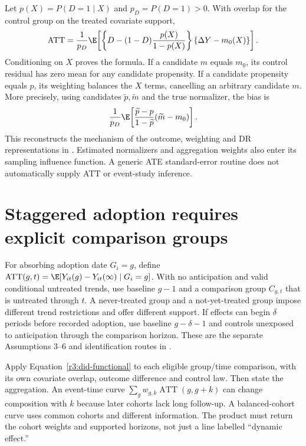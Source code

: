 Let $p(X)=P(D=1\mid X)$ and $p_D=P(D=1)>0$. With overlap for
the control group on the treated covariate support,
\begin{equation}
 \operatorname{ATT}
 =\frac1{p_D}\E\!\left[
 \left\{D-(1-D)\frac{p(X)}{1-p(X)}\right\}
                       \{\Delta Y-m_0(X)\}\right].
 \label{r3:did-dr}
\end{equation}
Conditioning on $X$ proves the formula. If a candidate $m$ equals
$m_0$, its control residual has zero mean for any candidate propensity.
If a candidate propensity equals $p$, its weighting balances the
$X$ terms, cancelling an arbitrary candidate $m$. More precisely,
using candidates $\widetilde p,\widetilde m$ and the true normalizer,
the bias is
\[
 \frac1{p_D}\E\!\left[
 \frac{\widetilde p-p}{1-\widetilde p}
                         (\widetilde m-m_0)\right].
\]
This reconstructs the mechanism of the outcome, weighting and
DR representations in \citet[Section 2.4 and Theorem 1]{callaway2021}.
Estimated normalizers and aggregation weights also enter its sampling
influence function. A generic ATE standard-error routine does not
automatically supply ATT or event-study inference.

\section{Staggered adoption requires explicit comparison groups}
\label{r3:staggered}
For absorbing adoption date $G_i=g$, define
$\operatorname{ATT}(g,t)=\E[Y_{it}(g)-Y_{it}(\infty)\mid G_i=g]$.
With no anticipation and valid conditional untreated trends, use
baseline $g-1$ and a comparison group $C_{g,t}$ that is untreated
through $t$. A never-treated group and a not-yet-treated group impose
different trend restrictions and offer different support. If effects
can begin $\delta$ periods before recorded adoption, use baseline
$g-\delta-1$ and controls unexposed to anticipation through the
comparison horizon. These are the separate Assumptions 3--6 and
identification routes in \citet{callaway2021}.

Apply Equation~\eqref{r3:did-functional} to each eligible group/time
comparison, with its own covariate overlap, outcome difference and
control law. Then state the aggregation. An event-time curve
$\sum_g w_{g,k}\operatorname{ATT}(g,g+k)$ can change composition
with $k$ because later cohorts lack long follow-up. A balanced-cohort
curve uses common cohorts and different information. The product must
return the cohort weights and supported horizons, not just a line
labelled ``dynamic effect.''

